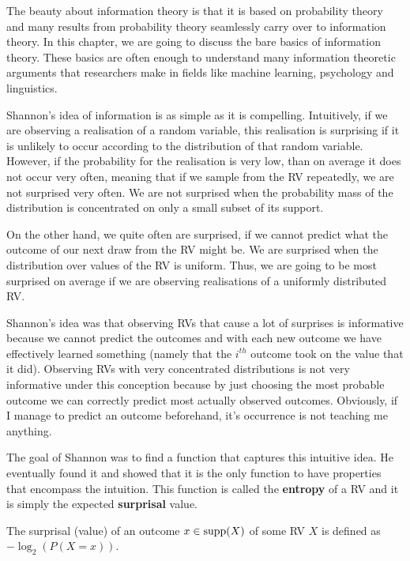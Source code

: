 The beauty about information theory is that it is based on probability theory and many results from probability theory seamlessly carry over to information theory.
In this chapter, we are going to discuss the bare basics of information theory. These basics are often enough to understand many information theoretic arguments
that researchers make in fields like machine learning, psychology and linguistics.

Shannon's idea of information is as simple as it is compelling. Intuitively, if we are observing a realisation of a random variable, this realisation is surprising
if it is unlikely to occur according to the distribution of that random variable. However, if the probability for the realisation is very low, than on average it
does not occur very often, meaning that if we sample from the RV repeatedly, we are not surprised very often. We are not surprised when the probability
mass of the distribution is concentrated on only a small subset of its support. 

On the other hand, we quite often are surprised,
if we cannot predict what the outcome of our next draw from the RV might be. We are surprised when the distribution over values of the RV is uniform. Thus,
we are going to be most surprised on average if we are observing realisations of a uniformly distributed RV.

Shannon's idea was that observing RVs that cause a lot of surprises is informative because we cannot predict the outcomes and with each new outcome we have effectively
learned something  (namely that the $ i^{th} $ outcome took on the value that it did). Observing RVs with very concentrated distributions is not very informative
under this conception because by just choosing the most probable outcome we can correctly predict most actually observed outcomes. Obviously, if I manage to predict
an outcome beforehand, it's occurrence is not teaching me anything.

The goal of Shannon was to find a function that captures this intuitive idea. He eventually found it and showed that it is the only function to have properties
that encompass the intuition. This function is called the \textbf{entropy} of a RV and it is simply the expected \textbf{surprisal} value.

\begin{Definition}[Surprisal]
The surprisal (value) of an outcome $ x \in \operatorname{supp}(X) $ of some RV $ X $ is defined as $ -\log_{2}(P(X=x))$.
\end{Definition} 

